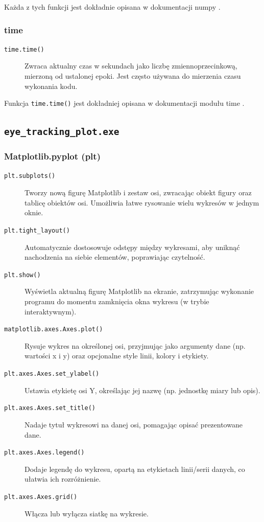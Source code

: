 \documentclass[a4paper,twoside,12pt]{book}
\begin{document}
Każda z tych funkcji jest dokładnie opisana w dokumentacji numpy \cite{bib:numpy-funkcje}.

\subsubsection{time}

\begin{description}
	\item[\texttt{time.time()}] Zwraca aktualny czas w sekundach jako liczbę zmiennoprzecinkową, mierzoną od ustalonej epoki. Jest często używana do mierzenia czasu wykonania kodu.
\end{description}

Funkcja \texttt{time.time()} jest dokładniej opisana w dokumentacji modułu time \cite{bib:time-Python}.

\subsection{\texttt{eye\_\-tracking\_\-plot\-.exe}}
\label{subsec:eye-tracking-plot.exe}

\subsubsection{Matplotlib.pyplot (plt)}

\begin{description}
	\item[\texttt{plt.subplots()}] Tworzy nową figurę Matplotlib i zestaw osi, zwracając obiekt figury oraz tablicę obiektów osi. Umożliwia łatwe rysowanie wielu wykresów w jednym oknie.
	\item[\texttt{plt.tight\_layout()}] Automatycznie dostosowuje odstępy między wykresami, aby uniknąć nachodzenia na siebie elementów, poprawiając czytelność.
	\item[\texttt{plt.show()}] Wyświetla aktualną figurę Matplotlib na ekranie, zatrzymując wykonanie programu do momentu zamknięcia okna wykresu (w trybie interaktywnym).
	\item[\texttt{matplotlib.axes.Axes.plot()}] Rysuje wykres na określonej osi, przyjmując jako argumenty dane (np. wartości x i y) oraz opcjonalne style linii, kolory i etykiety.
	\item[\texttt{plt.axes.Axes.set\_ylabel()}] Ustawia etykietę osi Y, określając jej nazwę (np. jednostkę miary lub opis).
	\item[\texttt{plt.axes.Axes.set\_title()}] Nadaje tytuł wykresowi na danej osi, pomagając opisać prezentowane dane.
	\item[\texttt{plt.axes.Axes.legend()}] Dodaje legendę do wykresu, opartą na etykietach linii/serii danych, co ułatwia ich rozróżnienie.
	\item[\texttt{plt.axes.Axes.grid()}] Włącza lub wyłącza siatkę na wykresie.
\end{description}
\end{document}
